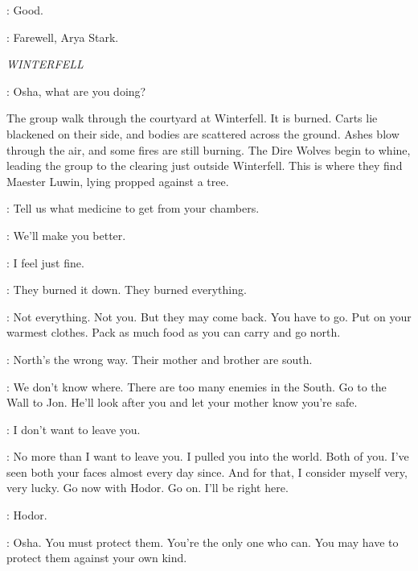 \JAQEN: Good.


\JAQEN: Farewell, Arya Stark. 



\scene

\textit{WINTERFELL} 


\BRAN: Osha, what are you doing? 

\n The group walk through the courtyard at Winterfell. It is burned. Carts lie blackened on their side, and bodies are scattered across the ground. Ashes blow through the air, and some fires are still burning. The Dire Wolves begin to whine, leading the group to the clearing just outside Winterfell. This is where they find Maester Luwin, lying propped against a tree.


\BRAN: Tell us what medicine to get from your chambers. 

\RICKON: We'll make you better. 

\LUWIN: I feel just fine. 

\BRAN: They burned it down. They burned everything. 

\LUWIN: Not everything. Not you. But they may come back. You have to go. Put on your warmest clothes. Pack as much food as you can carry and go north. 

\OSHA: North's the wrong way. Their mother and brother are south. 

\LUWIN: We don't know where. There are too many enemies in the South. Go to the Wall to Jon. He'll look after you and let your mother know you're safe. 

\BRAN: I don't want to leave you. 

\LUWIN: No more than I want to leave you.  I pulled you into the world. Both of you.  I've seen both your faces almost every day since. And for that, I consider myself very, very lucky. Go now with Hodor. Go on. I'll be right here. 

\HODOR:  Hodor. 


\LUWIN: Osha.  You must protect them. You're the only one who can. You may have to protect them against your own kind. 

